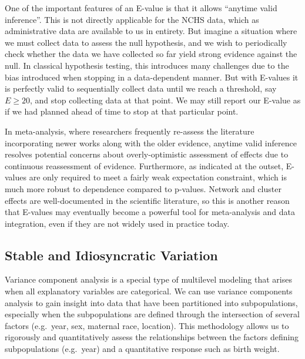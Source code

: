 One of the important features of an E-value is that it allows ``anytime valid inference''. This is not directly applicable for the NCHS data, which as administrative data are available to us in entirety. But imagine a situation where we must collect data to assess the null hypothesis, and we wish to periodically check whether the data we have collected so far yield strong evidence against the null. In classical hypothesis testing, this introduces many challenges due to the bias introduced when stopping in a data-dependent manner. But with E-values it is perfectly valid to sequentially collect data until we reach a threshold, say $E \ge 20$, and stop collecting data at that point. We may still report our E-value as if we had planned ahead of time to stop at that particular point.

In meta-analysis, where researchers frequently re-assess the literature incorporating newer works along with the older evidence, anytime valid inference resolves potential concerns about overly-optimistic assessment of effects due to continuous reassessment of evidence. Furthermore, as indicated at the outset, E-values are only required to meet a fairly weak expectation constraint, which is much more robust to dependence compared to p-values. Network and cluster effects are well-documented in the scientific literature, so this is another reason that E-values may eventually become a powerful tool for meta-analysis and data integration, even if they are not widely used in practice today.

\subsection{Stable and Idiosyncratic Variation}

Variance component analysis is a special type of multilevel modeling that arises when all explanatory variables are categorical. We can use variance components analysis to gain insight into data that have been partitioned into subpopulations, especially when the subpopulations are defined through the intersection of several factors (e.g.\ year, sex, maternal race, location). This methodology allows us to rigorously and quantitatively assess the relationships between the factors defining subpopulations (e.g.\ year) and a quantitative response such as birth weight.

